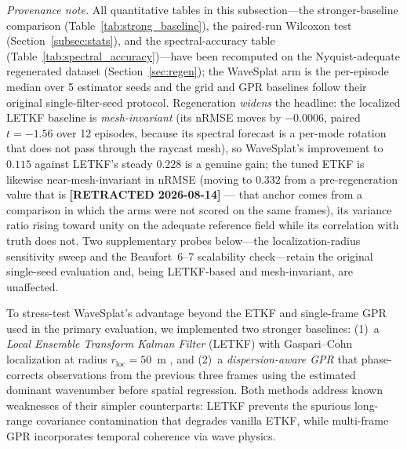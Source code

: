 \emph{Provenance note.}  All quantitative tables in this subsection---the
stronger-baseline comparison (Table~\ref{tab:strong_baseline}), the
paired-run Wilcoxon test (Section~\ref{subsec:stats}), and the
spectral-accuracy table (Table~\ref{tab:spectral_accuracy})---have been
recomputed on the Nyquist-adequate regenerated dataset
(Section~\ref{sec:regen}); the WaveSplat arm is the per-episode median
over 5 estimator seeds and the grid and GPR baselines follow their
original single-filter-seed protocol.  Regeneration \emph{widens} the
headline: the localized LETKF baseline is \emph{mesh-invariant}
(its nRMSE moves by $-0.0006$, paired $t=-1.56$ over 12 episodes,
because its spectral forecast is a per-mode rotation that does not pass
through the raycast mesh), so WaveSplat's improvement to $0.115$ against
LETKF's steady $0.228$ is a genuine gain; the tuned ETKF is likewise
near-mesh-invariant in nRMSE (moving to $0.332$ from a pre-regeneration
value that is \textbf{[RETRACTED 2026-08-14]} --- that anchor comes from a
comparison in which the arms were not scored on the same frames),
its variance ratio
rising toward unity on the adequate reference field while its correlation
with truth does not.  Two supplementary probes below---the
localization-radius sensitivity sweep and the Beaufort~6--7 scalability
check---retain the original single-seed evaluation and, being LETKF-based
and mesh-invariant, are unaffected.

To stress-test WaveSplat's advantage beyond the ETKF and single-frame
GPR used in the primary evaluation, we implemented two stronger
baselines: (1)~a \emph{Local Ensemble Transform Kalman Filter}
(LETKF) with Gaspari--Cohn localization at radius $r_{\text{loc}}=50$~m
\citep{hunt2007}, and (2)~a \emph{dispersion-aware GPR} that
phase-corrects observations from the previous three frames using the
estimated dominant wavenumber before spatial regression.  Both methods
address known weaknesses of their simpler counterparts: LETKF prevents
the spurious long-range covariance contamination that degrades vanilla
ETKF, while multi-frame GPR incorporates temporal coherence via
wave physics.

